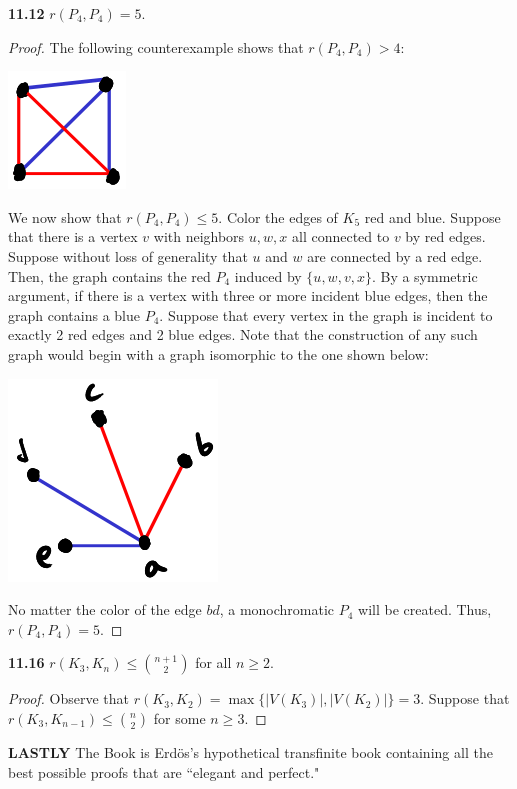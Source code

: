 \documentclass[12pt]{article}
\begin{document}
\newpage\noindent\textbf{11.12} $r(P_4, P_4) = 5$.
\begin{proof}
    The following counterexample shows that $r(P_4, P_4) > 4$:
    \begin{center} \includegraphics{8.png} \end{center}
    
        We now show that $r(P_4, P_4) \leq 5$.
        Color the edges of $K_5$ red and blue.
        Suppose that there is a vertex $v$ with neighbors $u, w, x$ all connected to $v$ by red edges.
        Suppose without loss of generality that $u$ and $w$ are connected by a red edge.
        Then, the graph contains the red $P_4$ induced by $\{u, w, v, x\}$.
        By a symmetric argument, if there is a vertex with three or more incident blue edges, then the graph contains a blue $P_4$.
        Suppose that every vertex in the graph is incident to exactly 2 red edges and 2 blue edges.
        Note that the construction of any such graph would begin with a graph isomorphic to the one shown below:
        \begin{center} \includegraphics[scale=.7]{9.png} \end{center}
        No matter the color of the edge $bd$, a monochromatic $P_4$ will be created.
        Thus, $r(P_4, P_4) = 5$.
\end{proof}

\newpage\noindent\textbf{11.16} $r(K_3, K_n) \leq {n+1 \choose 2}$ for all $n \geq 2$.
\begin{proof}
    Observe that $r(K_3, K_2) = \max\{|V(K_3)|, |V(K_2)|\} = 3$.
    Suppose that $r(K_3, K_{n-1}) \leq {n \choose 2}$ for some $n \geq 3$.
    

\end{proof}

\newpage\noindent\textbf{LASTLY} The Book is Erdös's hypothetical transfinite book containing all the best possible proofs that are ``elegant and perfect."
\end{document}
